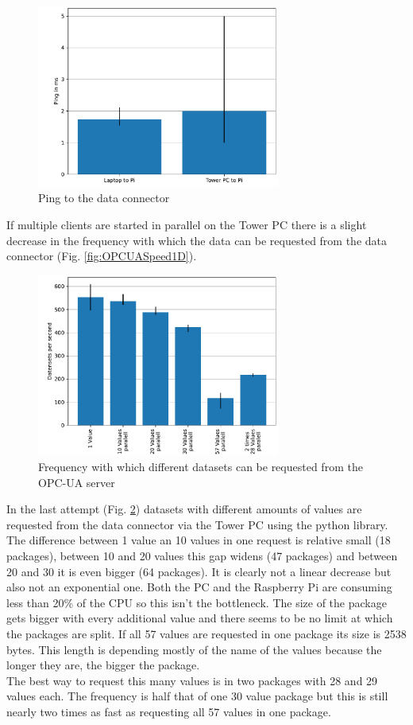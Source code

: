 \documentclass[conference]{IEEEtran}
\begin{document}
\begin{figure}[htbp]
    \centerline{\includegraphics[width=8cm]{Pictures/PingDiagram.pdf}}
    \caption{Ping to the data connector}
    \label{fig:PingDiagram}
\end{figure}
If multiple clients are started in parallel on the Tower PC there is a slight decrease in the frequency with which the data can be requested from the data connector (Fig. \ref{fig:OPCUASpeed1D}).\\
\begin{figure}[htbp]
    \centerline{\includegraphics[width=8cm]{Pictures/OPCUAMultipleDatenAufEinmal.pdf}}
    \caption{Frequency with which different datasets can be requested from the OPC-UA server}
    \label{fig:OPCUAMultipleDatenAufEinmal}
\end{figure}
In the last attempt (Fig. \ref{fig:OPCUAMultipleDatenAufEinmal}) datasets with different amounts of values are requested from the data connector via the Tower PC using the python library.
The difference between 1 value an 10 values in one request is relative small (18 packages), between 10 and 20 values this gap widens (47 packages) and between 20 and 30 it is even bigger (64 packages).
It is clearly not a linear decrease but also not an exponential one. 
Both the PC and the Raspberry Pi are consuming less than 20\% of the CPU so this isn't the bottleneck.
The size of the package gets bigger with every additional value and there seems to be no limit at which the packages are split.
If all 57 values are requested in one package its size is 2538 bytes.
This length is depending mostly of the name of the values because the longer they are, the bigger the package.\\
The best way to request this many values is in two packages with 28 and 29 values each.
The frequency is half that of one 30 value package but this is still nearly two times as fast as requesting all 57 values in one package.
\end{document}
